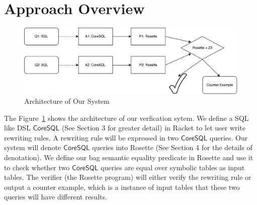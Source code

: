 \section{Approach Overview}

\begin{figure}[t]
 \centering
 \includegraphics[width=0.7\linewidth]{SymSQLArch}
 \caption{Architecture of Our System}
 \label{fig:arch}
\end{figure}

The Figure~\ref{fig:arch} shows the architecture of our verfication sytem. We define a SQL like DSL $\mathsf{CoreSQL}$ 
(See Section 3 for greater detail) in Racket
to let user write rewriting rules. 
A rewriting rule will be expressed in two $\mathsf{CoreSQL}$ queries.
Our system will denote $\mathsf{CoreSQL}$ queries into Rosette 
\cite{rosette} (See Section 4 for the details of denotation). 
We define our bag semantic equality predicate in Rosette and use it 
to check whether two $\mathsf{CoreSQL}$ queries are equal over 
symbolic tables as input tables. The verifier (the Rosette program) 
will either verify the rewriting rule or output a counter example,
which is a instance of input tables that these two queries will 
have different results.



